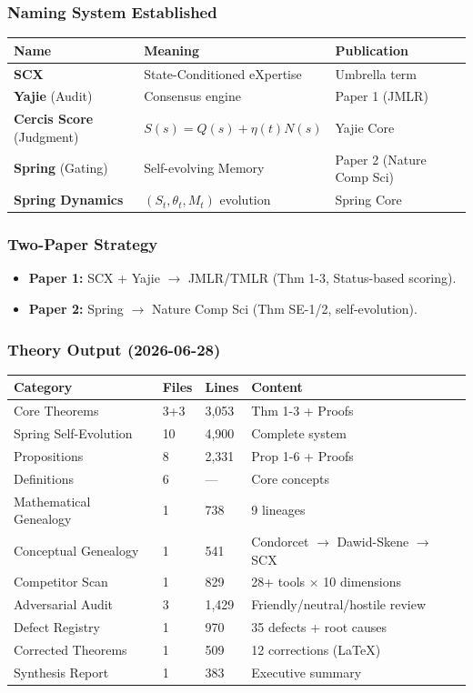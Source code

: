 \documentclass[12pt]{article}
\begin{document}
\subsubsection{Naming System Established}
\begin{longtable}{@{}p{} p{} p{}@{}}
\toprule Name & Meaning & Publication \\
\midrule
\textbf{SCX} & State-Conditioned eXpertise & Umbrella term \\
\textbf{Yajie} (Audit) & Consensus engine & Paper 1 (JMLR) \\
\textbf{Cercis Score} (Judgment) & \(S(s) = Q(s) + \eta(t)N(s)\) & Yajie Core \\
\textbf{Spring} (Gating) & Self-evolving Memory & Paper 2 (Nature Comp Sci) \\
\textbf{Spring Dynamics} & \((S_t, \theta_t, M_t)\) evolution & Spring Core \\
\bottomrule
\end{longtable}

\subsubsection{Two-Paper Strategy}
\begin{itemize}
\item \textbf{Paper 1:} SCX + Yajie \(\to\) JMLR/TMLR (Thm 1-3, Status-based scoring).
\item \textbf{Paper 2:} Spring \(\to\) Nature Comp Sci (Thm SE-1/2, self-evolution).
\end{itemize}

\subsubsection{Theory Output (2026-06-28)}
\begin{longtable}{@{}p{} p{} p{} p{}@{}}
\toprule Category & Files & Lines & Content \\
\midrule
Core Theorems & 3+3 & 3,053 & Thm 1-3 + Proofs \\
Spring Self-Evolution & 10 & 4,900 & Complete system \\
Propositions & 8 & 2,331 & Prop 1-6 + Proofs \\
Definitions & 6 & --- & Core concepts \\
Mathematical Genealogy & 1 & 738 & 9 lineages \\
Conceptual Genealogy & 1 & 541 & Condorcet \(\to\) Dawid-Skene \(\to\) SCX \\
Competitor Scan & 1 & 829 & 28+ tools \(\times\) 10 dimensions \\
Adversarial Audit & 3 & 1,429 & Friendly/neutral/hostile review \\
Defect Registry & 1 & 970 & 35 defects + root causes \\
Corrected Theorems & 1 & 509 & 12 corrections (LaTeX) \\
Synthesis Report & 1 & 383 & Executive summary \\
\bottomrule
\end{longtable}
\end{document}
